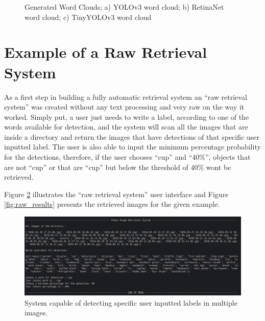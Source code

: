 \begin{figure}[H]
\begin{subfigure}{0.3\textwidth}
      \caption{}
      \end{subfigure}
      \caption[Generated Word Clouds]{Generated Word Clouds; a) YOLOv3 word cloud; b) RetinaNet word cloud; c) TinyYOLOv3 word cloud}
      \label{fig:wordcloudss}
    \end{figure}

    

     

\section{Example of a Raw Retrieval System}
\label{sec:alpha_retrieval}

As a first step in building a fully automatic retrieval system an \enquote{raw retrieval system} was created without any text processing and very raw on the way it worked. Simply put, a user just needs to write a label, according to one of the words available for detection, and the system will scan all the images that are inside a directory and return the images that have detections of that specific user inputted label. The user is also able to input the minimum percentage probability for the detections, therefore, if the user chooses \enquote{cup} and \enquote{40\%}, objects that are not \enquote{cup} or that are \enquote{cup} but below the threshold of 40\% wont be retrieved. 

Figure \ref{fig:raw} illustrates the \enquote{raw retrieval system} user interface and Figure \ref{fig:raw_results} presents the retrieved images for the given example.

\begin{figure}[H]
  \centering
  \includegraphics[width = \textwidth]{Sections/4InitialWork/4_images_random/alpha.png}
  \caption[Raw retrieval system]{System capable of detecting specific user inputted labels in multiple images. }
  \label{fig:raw} 
\end{figure}




